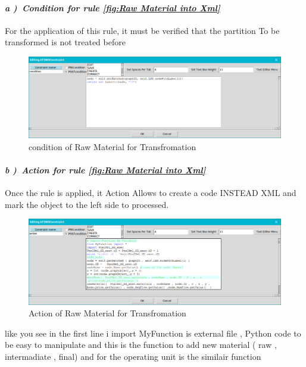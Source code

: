 \pagebreak
\paragraph{\emph{ a )~Condition for rule \ref{fig:Raw Material into Xml} } } For the application of this rule, it must be verified that the partition To be transformed is not treated before

\begin{figure}[th]
	\centering  %
 	\includegraphics[scale=1.1]{Chapiter3/img/xcond1}
	\caption{\label{fig:condition of Raw Material for Transfromation}condition of Raw Material for Transfromation}
\end{figure}
\paragraph{\emph{ b )~Action for rule \ref{fig:Raw Material into Xml} } }  Once the rule is applied, it Action Allows to create a code INSTEAD XML and mark the object to the left side to processed.  
 
\begin{figure}[th]
	\centering  %
 	\includegraphics[scale=0.66]{Chapiter3/img/xact1}
	\caption{\label{fig:Action of Raw Material for Transfromation}Action of Raw Material for Transfromation}
\end{figure} 
\vspace{1cm}
like you see in the first line i import MyFunction is external file , Python code 
to be easy to manipulate  and this is the function to add new material ( raw , intermadiate , final)
and for the operating unit is the similair function
 
